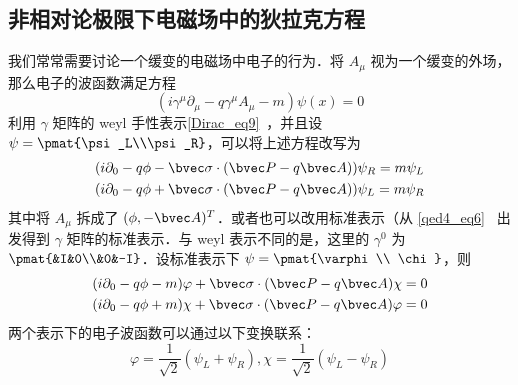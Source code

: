 \subsection{非相对论极限下电磁场中的狄拉克方程}\label{DiracE_sub1}
我们常常需要讨论一个缓变的电磁场中电子的行为．将 $A_\mu$ 视为一个缓变的外场，那么电子的波函数满足方程
\begin{equation}\label{DiracE_eq4}
(i\gamma^\mu \partial_\mu -q\gamma^\mu A_\mu - m)\psi(x)=0
\end{equation}
利用 $\gamma$ 矩阵的 weyl 手性表示\autoref{Dirac_eq9}~，并且设 $\psi = \pmat{\psi_L\\\psi_R}$，可以将上述方程改写为
\begin{equation}
\begin{aligned}
&(i\partial_0 - q\phi-\bvec \sigma\cdot (\bvec P-q\bvec A))\psi_R=m\psi_L\\
&(i\partial_0-q\phi+\bvec \sigma\cdot (\bvec P-q\bvec A))\psi_L = m\psi_R
\end{aligned}
\end{equation}
其中将 $A_\mu$ 拆成了 $(\phi,-\bvec A)^T$．或者也可以改用标准表示（从 \autoref{qed4_eq6}~ 出发得到 $\gamma$ 矩阵的标准表示．与 weyl 表示不同的是，这里的 $\gamma^0$ 为 $\pmat{&I&0\\&0&-I}$．设标准表示下 $\psi=\pmat{\varphi\\ \chi}$，则
\begin{equation}\label{DiracE_eq1}
\begin{aligned}
&(i\partial_0-q\phi-m)\varphi+\bvec \sigma\cdot (\bvec P-q\bvec A)\chi=0\\
&(i\partial_0-q\phi+m)\chi+\bvec \sigma\cdot (\bvec P-q\bvec A)\varphi=0
\end{aligned}
\end{equation}
两个表示下的电子波函数可以通过以下变换联系：
\begin{equation}
\varphi = \frac{1}{\sqrt{2}}(\psi_L+\psi_R),\chi = \frac{1}{\sqrt{2}}(\psi_L-\psi_R)
\end{equation}


